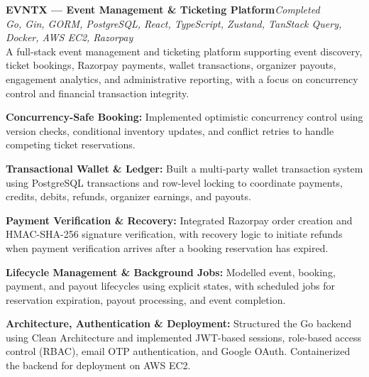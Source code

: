 \documentclass[10pt,a4paper]{article}
\begin{document}
\vspace{8pt}

\noindent\textbf{EVNTX --- Event Management \& Ticketing Platform}\hfill\textit{Completed} \enspace\textbar{}\\[1.5pt]
\noindent\textit{Go, Gin, GORM, PostgreSQL, React, TypeScript, Zustand, TanStack Query, Docker, AWS EC2, Razorpay}\\[2.5pt]
A full-stack event management and ticketing platform supporting event discovery, ticket bookings, Razorpay payments, wallet transactions, organizer payouts, engagement analytics, and administrative reporting, with a focus on concurrency control and financial transaction integrity.
\begin{resumelist}
  \item \textbf{Concurrency-Safe Booking:} Implemented optimistic concurrency control using version checks, conditional inventory updates, and conflict retries to handle competing ticket reservations.
  \item \textbf{Transactional Wallet \& Ledger:} Built a multi-party wallet transaction system using PostgreSQL transactions and row-level locking to coordinate payments, credits, debits, refunds, organizer earnings, and payouts.
  \end{resumelist}
\newpage
\begin{resumelist}
  \item \textbf{Payment Verification \& Recovery:} Integrated Razorpay order creation and HMAC-SHA-256 signature verification, with recovery logic to initiate refunds when payment verification arrives after a booking reservation has expired.
  \item \textbf{Lifecycle Management \& Background Jobs:} Modelled event, booking, payment, and payout lifecycles using explicit states, with scheduled jobs for reservation expiration, payout processing, and event completion.
  \item \textbf{Architecture, Authentication \& Deployment:} Structured the Go backend using Clean Architecture and implemented JWT-based sessions, role-based access control (RBAC), email OTP authentication, and Google OAuth. Containerized the backend for deployment on AWS EC2.
\end{resumelist}

\vspace{8pt}
\end{document}
